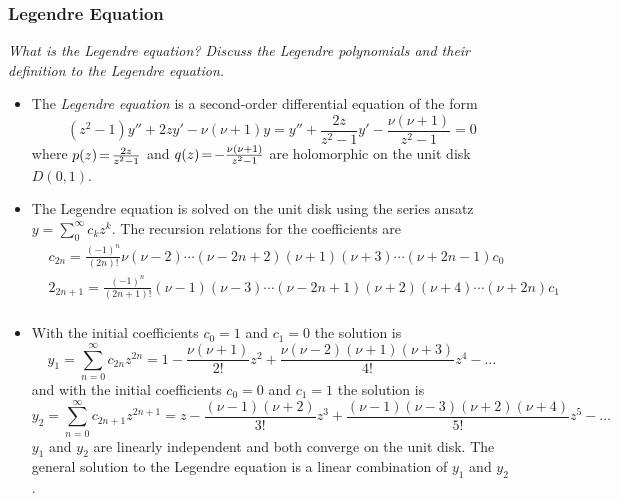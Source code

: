 \documentclass[11pt, a4paper]{article}
\newcommand{\question}[1]{\textit{#1}\vspace{2mm}}
\begin{document}
\subsubsection{Legendre Equation}
\question{What is the Legendre equation? Discuss the Legendre polynomials and their definition to the Legendre equation.}
\begin{itemize}
	\item The \textit{Legendre equation} is a second-order differential equation of the form
	\begin{equation*}
		(z^2 - 1)y'' + 2zy' - \nu (\nu + 1) y = y'' + \frac{2z}{z^{2} -1} y' - \frac{\nu(\nu+1)}{z^{2}-1} = 0
	\end{equation*}
	where $ p(z) \hspace{-.5mm} = \hspace{-.5mm} \frac{2z}{z^2 - 1} $ and  $ q(z)\hspace{-.5mm} = \hspace{-.5mm} - \frac{\nu (\nu + 1)}{z^2 - 1} $ are  holomorphic on the unit disk $ D(0, 1) $.
	
	\item The Legendre equation is solved on the unit disk using the series ansatz $ \displaystyle{y = \sum_{0}^{\infty} c_k z^k} $. The recursion relations for the coefficients are
	\begin{align*}
		&c_{2n} = \frac{(-1)^n}{(2n)!} \nu(\nu-2)\cdots(\nu - 2n + 2)(\nu + 1)(\nu + 3)\cdots(\nu + 2n -1)c_0\\
		&2_{2n+1} = \frac{(-1)^n}{(2n+1)!}(\nu-1)(\nu-3)\cdots(\nu - 2n + 1)(\nu+2)(\nu + 4)\cdots(\nu + 2n)c_1\\
	\end{align*}
	
	\item With the initial coefficients $ c_0 = 1 $ and $ c_1 = 0 $ the solution is 
	\begin{equation*}
		y_1 = \sum_{n=0}^{\infty}c_{2n}z^{2n} = 1 - \frac{\nu(\nu+1)}{2!}z^2 + \frac{\nu(\nu-2)(\nu+1)(\nu+3)}{4!}z^4 - \dots
	\end{equation*}
	and with the initial coefficients $ c_0 = 0 $ and $ c_1 = 1 $ the solution is
	\begin{equation*}
		y_2 = \sum_{n=0}^{\infty}c_{2n+1}z^{2n+1} = z - \frac{(\nu-1)(\nu+2)}{3!}z^3 + \frac{(\nu-1)(\nu-3)(\nu+2)(\nu+4)}{5!}z^5 - \dots
	\end{equation*}
	$ y_{1} $ and $ y_{2} $ are linearly independent and both converge on the unit disk. The general solution to the Legendre equation is a linear combination of $ y_{1} $ and $ y_{2} $.


\end{itemize}
\end{document}
